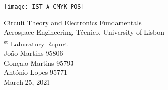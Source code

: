 
\thispagestyle {empty}

\texttt{[image: IST\_A\_CMYK\_POS]}

\begin{center}
%
\vspace{1.0cm}

\vspace{1cm}
{\FontLb Circuit Theory and Electronics Fundamentals} \\ %
\vspace{1cm}
{\FontSn Aerospace Engineering, Técnico, University of Lisbon} \\ %
\vspace{1cm}
{\textsuperscript{st} Laboratory Report} \\
\vspace{1cm}
{\FontSn João Martins 95806} \\
{\FontSn Gonçalo Martins 95793}\\
{\FontSn António Lopes 95771}\\
\vspace{1cm}
{\FontSn March 25, 2021} \\ %
%
\end{center}

